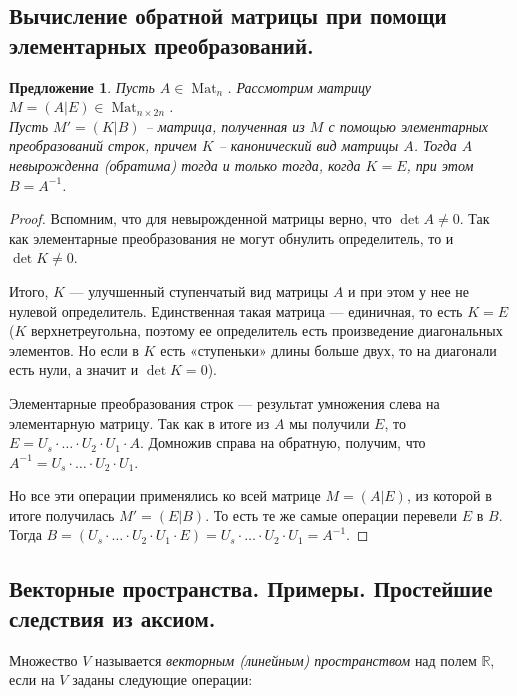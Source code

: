 \documentclass[a4paper, 12pt]{article}
\DeclareMathOperator{\Mat}{Mat}
\newtheorem*{proposal}{Предложение}
\begin{document}
\subsection{Вычисление обратной матрицы при помощи элементарных преобразований.}
\begin{proposal}
Пусть $A \in \Mat_n$.
Рассмотрим матрицу $M = (A|E) \in \Mat_{n \times 2n}$.\\
Пусть $M' = (K|B)$ -- матрица, полученная из $M$ с помощью элементарных преобразований строк, причем $K$ -- канонический вид матрицы $A$.
Тогда $A$ невырожденна (обратима) тогда и только тогда, когда $K=E$, при этом $B = A^{-1}$. 
\end{proposal}
\begin{proof}
Вспомним, что для невырожденной матрицы верно, что $\det A \neq 0$. Так как элементарные преобразования не могут обнулить определитель, то и $\det K \neq 0$.

Итого, $K$ — улучшенный ступенчатый вид матрицы $A$ и при этом у нее не нулевой определитель. Единственная такая матрица — единичная, то есть $K = E$ ($K$ верхнетреугольна, поэтому ее определитель есть произведение диагональных элементов. Но если в $K$ есть «ступеньки» длины больше двух, то на диагонали есть нули, а значит и $\det K = 0$).

Элементарные преобразования строк --- результат умножения слева на элементарную матрицу. Так как в итоге из $A$ мы получили $E$, то $E = U_s \cdot \ldots \cdot U_2 \cdot U_1 \cdot A$. Домножив справа на обратную, получим, что $A^{-1} = U_s \cdot \ldots \cdot U_2 \cdot U_1$.

Но все эти операции применялись ко всей матрице $M = (A|E)$, из которой в итоге получилась $M' = (E|B)$. То есть те же самые операции перевели $E$ в $B$. Тогда $B = (U_s \cdot \ldots \cdot U_2 \cdot U_1 \cdot E) = U_s \cdot \ldots \cdot U_2 \cdot U_1 = A^{-1}$.
\end{proof}

\subsection{Векторные пространства. Примеры. Простейшие следствия из аксиом.}
Множество $V$ называется \textit{векторным (линейным) пространством} над полем $\mathbb{R}$, если на $V$ заданы следующие операции:
\end{document}
